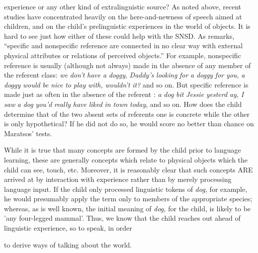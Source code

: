 experience or any other kind of extralinguistic source? As noted above, recent studies have concentrated heavily on the here-and-newness of speech aimed at children, and on the child's prelinguistic experiences in the world of objects. It is hard to see just how either of these could help with the SNSD. As \citet[94]{Maratsos1976} remarks, ``specific and nonspecific reference are connected in no clear way with external physical attributes or relations of perceived objects.'' For example, nonspecific reference is usually (although not always) made in the absence of any member of the referent class: \textit{we} \textit{don't} \textit{have} \textit{a} \textit{dogg}\textit{y}, \textit{Dad}\textit{d}\textit{y's} \textit{looki}\textit{n}\textit{g} \textit{for} \textit{a} \textit{doggy} \textit{for} \textit{you,} \textit{a} \textit{doggy} \textit{would} \textit{be} \textit{nice} \textit{to} \textit{play} \textit{with,} \textit{wouldn't} \textit{it?} and so on. But specific reference is made just as often in the absence of the referent : \textit{a} \textit{dog} \textit{bit} \textit{Jessie} \textit{yesterd} \textit{ay,} \textit{I} \textit{saw} \textit{a} \textit{dog} \textit{you'd} \textit{really} \textit{have} \textit{liked} \textit{in} \textit{town} \textit{toda}\textit{y}, and so on. How does the child determine that of the two absent sets of referents one is concrete while the other is only hypothetical? If he did not do so, he would score no better than chance on Maratsos' tests.


While it is true that many concepts are formed by the child prior to language learning, these are generally concepts which relate to physical objects which the child can see, touch, etc. Moreover, it is reasonably clear that such concepts ARE arrived at by interaction with experience rather than by merely processing language input. If the child only processed linguistic tokens of \textit{dog,} for example, he would pre\-sumably apply the term only to members of the appropriate species; whereas, as is well known, the initial meaning of \textit{dog,} for the child, is likely to be 'any four-legged mammal'. Thus, we know that the child reaches out ahead of linguistic experience, so to speak, in order

to derive ways of talking about the world.

